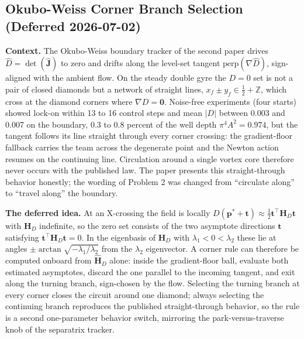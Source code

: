 \subsection{Okubo-Weiss Corner Branch Selection (Deferred 2026-07-02)}
\label{sec:ch9:ow_corner_branch}


\textbf{Context.} The Okubo-Weiss boundary tracker of the second paper
drives $\hat{D} = \det(\hat{\mathbf{J}})$ to zero and drifts along the
level-set tangent $\mathrm{perp}(\nabla\hat{D})$, sign-aligned with the
ambient flow. On the steady double gyre the $D = 0$ set is not a pair of
closed diamonds but a network of straight lines,
$x_f \pm y_f \in \tfrac{1}{2} + \mathbb{Z}$, which cross at the diamond
corners where $\nabla D = \mathbf{0}$. Noise-free experiments (four
starts) showed lock-on within 13 to 16 control steps and mean $|D|$
between 0.003 and 0.007 on the boundary, 0.3 to 0.8 percent of the well
depth $\pi^4 A^2 = 0.974$, but the tangent follows its line straight
through every corner crossing: the gradient-floor fallback carries the
team across the degenerate point and the Newton action resumes on the
continuing line. Circulation around a single vortex core therefore never
occurs with the published law. The paper presents this straight-through
behavior honestly; the wording of Problem 2 was changed from ``circulate
along'' to ``travel along'' the boundary.

\textbf{The deferred idea.} At an X-crossing the field is locally
$D(\mathbf{p}^* + \mathbf{t}) \approx \tfrac{1}{2}\mathbf{t}^\top
\mathbf{H}_D \mathbf{t}$ with $\mathbf{H}_D$ indefinite, so the zero set
consists of the two asymptote directions $\mathbf{t}$ satisfying
$\mathbf{t}^\top \mathbf{H}_D \mathbf{t} = 0$. In the eigenbasis of
$\mathbf{H}_D$ with $\lambda_1 < 0 < \lambda_2$ these lie at angles
$\pm\arctan\sqrt{-\lambda_1/\lambda_2}$ from the $\lambda_2$
eigenvector. A corner rule can therefore be computed onboard from
$\hat{\mathbf{H}}_D$ alone: inside the gradient-floor ball, evaluate
both estimated asymptotes, discard the one parallel to the incoming
tangent, and exit along the turning branch, sign-chosen by the flow.
Selecting the turning branch at every corner closes the circuit around
one diamond; always selecting the continuing branch reproduces the
published straight-through behavior, so the rule is a second
one-parameter behavior switch, mirroring the park-versus-traverse knob
of the separatrix tracker.

